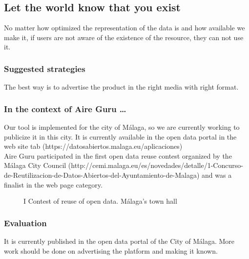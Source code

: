 \subsection{Let the world know that you exist}

No matter how optimized the representation of the data is and how available we make it, if users are not aware
of the existence of the resource, they can not use it.

\subsubsection*{Suggested strategies} 

The best way is to advertise the product in the right media with right format.

\subsubsection*{In the context of Aire Guru \ldots}

Our tool is implemented for the city of Málaga, so we are currently working to publicize it in this city.
It is currently available in the open data portal in the web site tab (https://datosabiertos.malaga.eu/aplicaciones) \\

Aire Guru participated in the first open data reuse contest organized by the Málaga City Council (http://cemi.malaga.eu/es/novedades/detalle/1-Concurso-de-Reutilizacion-de-Datos-Abiertos-del-Ayuntamiento-de-Malaga)
and was a finalist in the web page category.

\begin{figure}[ht]
    \centering
   \hfill
 
    \caption{I Contest of reuse of open data. Málaga's town hall}
    \end{figure}

\subsubsection*{Evaluation}  

\begin{itemize}
    \done It is currently published in the open data portal of the City of Málaga.
    \crossed More work should be done on advertising the platform and making it known.
\end{itemize}